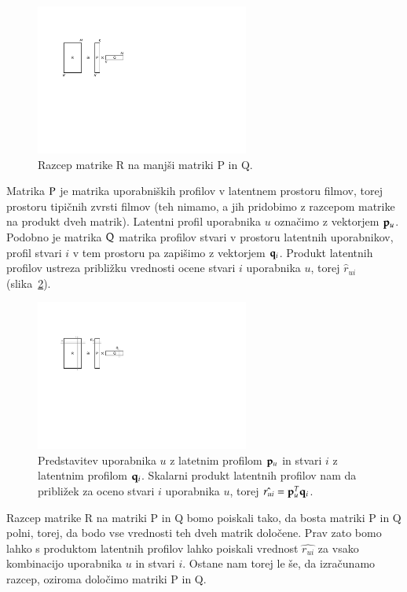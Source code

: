 \begin{figure}[htbp]
\begin{center}
\includegraphics[width=7cm]{slike/matricni-razcep.pdf}
\caption{Razcep matrike R na manjši matriki P in Q.}
\label{f:matricni-razcep}
\end{center}
\end{figure}

Matrika $\rm P$ je matrika uporabniških profilov v latentnem prostoru filmov, torej prostoru tipičnih zvrsti filmov (teh nimamo, a jih pridobimo z razcepom matrike na produkt dveh matrik). Latentni profil uporabnika $u$ označimo z vektorjem ${\bf p}_u$. Podobno je matrika $\rm Q$ matrika profilov stvari v prostoru latentnih uporabnikov, profil stvari $i$ v tem prostoru pa zapišimo z vektorjem ${\bf q}_i$. Produkt latentnih profilov ustreza približku vrednosti ocene stvari $i$ uporabnika $u$, torej $\hat{r}_{ui}$ (slika~\ref{f:latentni-faktorji}).

\begin{figure}[htbp]
\begin{center}
\includegraphics[width=7cm]{slike/latentni-faktorji.pdf}
\caption{Predstavitev uporabnika $u$ z latetnim profilom ${\bf p}_u$ in stvari $i$ z latentnim profilom ${\bf q}_i$. Skalarni produkt latentnih profilov nam da približek za oceno stvari $i$ uporabnika $u$, torej $\hat{r_{ui}}={\bf p}_u^T {\bf q}_i$.}
\label{f:latentni-faktorji}
\end{center}
\end{figure}

Razcep matrike R na matriki P in Q bomo poiskali tako, da bosta matriki P in Q polni, torej, da bodo vse vrednosti teh dveh matrik določene. Prav zato bomo lahko s produktom latentnih profilov lahko poiskali vrednost $\hat{r_{ui}}$ za vsako kombinacijo uporabnika $u$ in stvari $i$. Ostane nam torej le še, da izračunamo razcep, oziroma določimo matriki P in Q.

